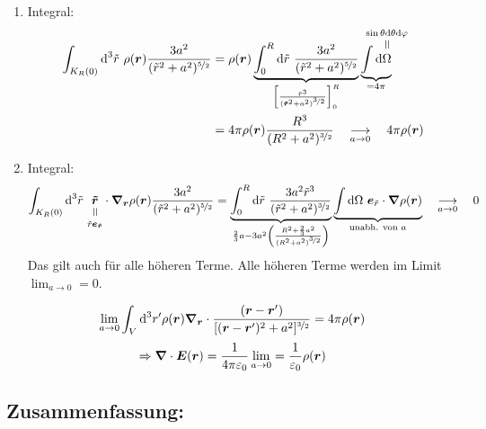 \begin{enumerate}
	\item Integral:
	\begin{align*}
	\int_{K_R (0)} \dd^3 \tilde r\ \rho(\vec{r}) \frac{3a^2}{(\tilde{r}^2 + a^2)^{\nicefrac{5}{2}}} &= \rho(\vec{r}) \underbrace{\intt{0}{R} \dd\tilde r\ \frac{3a^2}{(\tilde{r}^2 + a^2)^{\nicefrac{5}{2}}}}_{\left[\frac{\tilde r^3}{(\vec{\tilde{r}}^2 + a^2)^{\nicefrac{3}{2}}}\right]_0^R} \underbrace{\int \dd \equaltoup{\Omega}{\mathclap{\sin \theta \dd \theta \dd \varphi}}}_{= 4\pi}\\
	&= 4 \pi \rho(\vec{r}) \frac{R^3}{(R^2 + a^2)^{\nicefrac{3}{2}}} \quad \underset{a \to 0}{\longrightarrow} \quad 4 \pi \rho(\vec{r})
	\end{align*} 
	\item Integral:
	$$\int_{K_R (0)} \dd^3 \tilde{r}\ \equalto{\vec{\tilde{r}}}{\tilde{r}\vec{e}_{\vec{\tilde{r}}}} \cdot \vabla_{\vec{r}} \rho(\vec{r}) \frac{3 a^2}{(\tilde{r}^2 + a^2)^{\nicefrac{5}{2}}} = \underbrace{\intt{0}{R} \dd \tilde r\ \frac{3a^2 \tilde r^3}{(\tilde r^2 + a^2)^{\nicefrac{3}{2}}}}_{\frac{2}{3}a -3a^2 \left(\frac{R^2 +\frac{2}{3}a^2}{(R^2 + a^2)^{\nicefrac{3}{2}}}\right)} \underbrace{\int \dd \Omega\ \vec{e}_{\tilde{r}} \cdot \vabla \rho(\vec{r})}_{\textrm{unabh. von } a} \quad \underset{a \to 0}{\longrightarrow} \quad 0$$
	Das gilt auch für alle höheren Terme. Alle höheren Terme werden im Limit $ \lim_{a \to 0} $$ = 0 $.
\end{enumerate}

$$\lim_{a \to 0} \int_V \textrm{d}^3 r' \rho(\bm{r}) \bm{\nabla}_{\bm{r}}\cdot \frac{(\bm{r}-\bm{r}')}{[(\bm{r}-\bm{r}')^2 + a^2]^{\nicefrac{3}{2}}} = 4 \pi \rho (\bm{r})$$
$$\Rightarrow \bm{\nabla} \cdot \bm{E}(\bm{r}) = \frac{1}{4\pi\varepsilon_0} \lim_{a \to 0} = \frac{1}{\varepsilon_0} \rho(\bm{r})$$
\begin{center}
	\begin{minipage}{.5\linewidth}
	\end{minipage}
\end{center}

\subsection{Zusammenfassung:}

